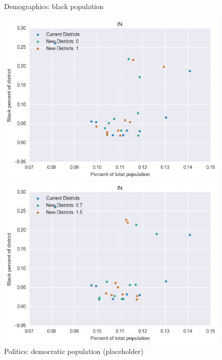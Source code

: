 \begin{figure}[htb!] \centering
\caption{ Demographics: black population }
\includegraphics[width=4.5in]{../analysis/IN/analysis_scatter.png}
\caption{ Politics: democratic population (placeholder)}
\includegraphics[width=4.5in]{../analysis/IN/analysis_scatter2.png}
\end{figure}

\clearpage
\newpage

